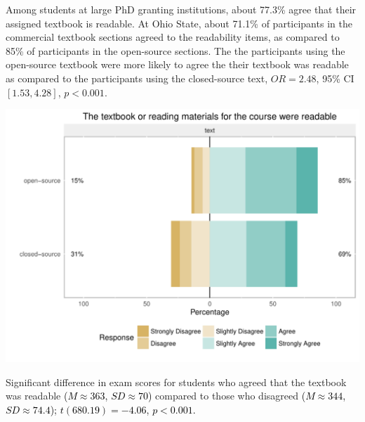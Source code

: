 \documentclass{ximera}
\begin{document}
Among students at large PhD granting institutions, about 77.3\% agree
that their assigned textbook is readable.  At Ohio State, about 71.1\%
of participants in the commercial textbook sections agreed to the
readability items, as compared to 85\% of participants in the
open-source sections.  The the participants using the open-source
textbook were more likely to agree the their textbook was readable as
compared to the participants using the closed-source text,
\(OR = 2.48\), 95\% CI \([ 1.53 , 4.28 ]\), \(p < 0.001\).

\begin{image}
  \includegraphics{more-readable.png}
\end{image}

Significant difference in exam scores for students who agreed that the
textbook was readable \textcolor{black}{(\(M \approx 363\),
  \(SD \approx 70\))} compared to those who disagreed
\textcolor{black}{(\(M \approx 344\), \(SD \approx 74.4\));}
\textcolor{black}{\(t( 680.19 ) = -4.06\), \(p < 0.001\).}
\end{document}
